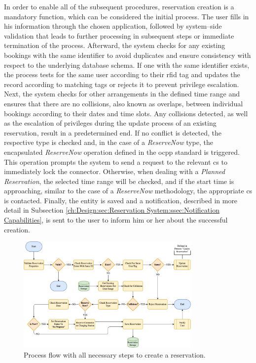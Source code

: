 In order to enable all of the subsequent procedures, reservation creation is a mandatory function, which can be considered the initial process. The user fills in his information through the chosen application, followed by system--side validation that leads to further processing in subsequent steps or immediate termination of the process.
Afterward, the system checks for any existing bookings with the same identifier to avoid duplicates and ensure consistency with respect to the underlying database schema. If one with the same identifier exists, the process tests for the same user according to their \acrshort{rfid} tag and updates the record according to matching tags or rejects it to prevent privilege escalation.
Next, the system checks for other arrangements in the defined time range and ensures that there are no collisions, also known as overlaps, between individual bookings according to their dates and time slots.
Any collisions detected, as well as the escalation of privileges during the update process of an existing reservation, result in a predetermined end.
If no conflict is detected, the respective type is checked and, in the case of a \textit{ReserveNow} type, the encapsulated \textit{ReserveNow} operation defined in the \acrshort{ocpp} standard \cite{noauthor_ocpp_nodate} is triggered. This operation prompts the system to send a request to the relevant \acrshort{cs} to immediately lock the connector.
Otherwise, when dealing with a \textit{Planned Reservation}, the selected time range will be checked, and if the start time is approaching, similar to the case of a \textit{ReserveNow} methodology, the appropriate \acrshort{cs} is contacted.
Finally, the entity is saved and a notification, described in more detail in Subsection \ref{ch:Design:sec:Reservation System:ssec:Notification Capabilities}, is sent to the user to inform him or her about the successful creation.

\begin{figure}[h]
    \centering
    \includegraphics[width=0.8\textwidth,keepaspectratio]{resources/images/main/5_design/processes/ReservationCreate.png}
    \caption{Process flow with all necessary steps to create a reservation.}
    \label{fig:create-reservation-flowchart}
\end{figure}

